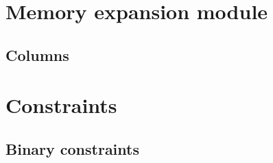 

\section{Memory expansion module}
\subsection{Columns}               \label{mxp: columns}                
\section{Constraints}
\subsection{Binary constraints}    \label{mxp: constraints: binary}    
